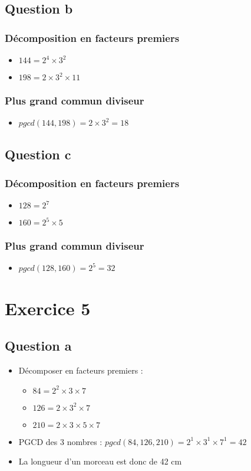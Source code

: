 \documentclass[a4paper,12pt]{article}
\begin{document}
\subsection{Question b}
\subsubsection{Décomposition en facteurs premiers}
\begin{itemize}
    \item $144 = 2^4 \times 3^2$
    \item $198 = 2 \times 3^2 \times 11$
\end{itemize}

\subsubsection{Plus grand commun diviseur}
\begin{itemize}
    \item $pgcd(144,198) = 2 \times 3^2 = 18$
\end{itemize}

\subsection{Question c}
\subsubsection{Décomposition en facteurs premiers}
\begin{itemize}
    \item $128 = 2^7$
    \item $160 = 2^5 \times 5$
\end{itemize}

\subsubsection{Plus grand commun diviseur}
\begin{itemize}
    \item $pgcd(128,160) = 2^5 = 32$
\end{itemize}

\section{Exercice 5}
\subsection{Question a}
\begin{itemize}
    \item Décomposer en facteurs premiers :
    \begin{itemize}
        \item $84 = 2^2 \times 3 \times 7$
        \item $126 = 2 \times 3^2 \times 7$
        \item $210 = 2 \times 3 \times 5 \times 7$
    \end{itemize}
    \item PGCD des 3 nombres : $pgcd(84,126,210) = 2^1 \times 3^1 \times 7^1 = 42$
    \item La longueur d'un morceau est donc de 42 cm
\end{itemize}
\end{document}
